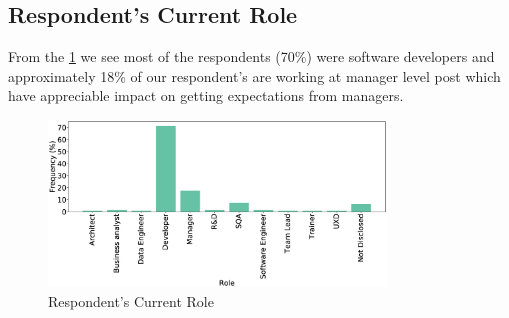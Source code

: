 \subsection{Respondent's Current Role}
From the \cref{fig:role} we see most of the respondents (70\%) were software developers and approximately 18\% of our respondent's are working at manager level post which have appreciable impact on getting expectations from managers.
\begin{figure}[H]
\centering
  \includegraphics[width=0.8\textwidth]{Figures/Respondents_Role}
  \caption{Respondent's Current Role}
  \label{fig:role}
\end{figure}
